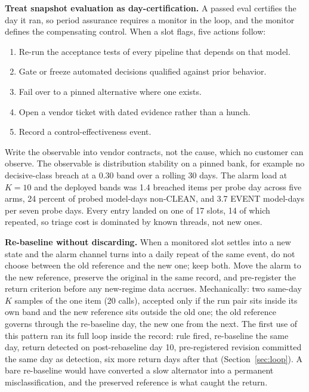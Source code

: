 \documentclass[conference]{IEEEtran}
\begin{document}
\textbf{Treat snapshot evaluation as day-certification.} A passed eval
certifies the day it ran, so period assurance requires a monitor in
the loop, and the monitor defines the compensating control. When a
slot flags, five actions follow:
\begin{enumerate}\itemsep0pt
\item Re-run the acceptance tests of every pipeline that depends on
  that model.
\item Gate or freeze automated decisions qualified against prior
  behavior.
\item Fail over to a pinned alternative where one exists.
\item Open a vendor ticket with dated evidence rather than a hunch.
\item Record a control-effectiveness event.
\end{enumerate}

Write the observable into vendor contracts, not the cause, which no
customer can observe. The observable is distribution stability on a
pinned bank, for example no decisive-class breach at a 0.30 band over
a rolling 30 days. The alarm load at $K{=}10$ and the deployed bands
was 1.4 breached items per probe day across five arms, 24 percent of
probed model-days non-CLEAN, and 3.7 EVENT model-days per seven probe
days. Every entry landed on one of 17 slots, 14 of which repeated, so
triage cost is dominated by known threads, not new ones.

\textbf{Re-baseline without discarding.} When a monitored slot settles
into a new state and the alarm channel turns into a daily repeat of
the same event, do not choose between the old reference and the new
one; keep both. Move the alarm to the new reference, preserve the
original in the same record, and pre-register the return criterion
before any new-regime data accrues. Mechanically: two same-day $K$
samples of the one item (20 calls), accepted only if the run pair sits
inside its own band and the new reference sits outside the old one;
the old reference governs through the re-baseline day, the new one
from the next. The first use of this pattern ran its full loop inside
the record: rule fired, re-baseline the same day, return detected on
post-rebaseline day 10, pre-registered revision committed the same day
as detection, six more return days after that
(Section~\ref{sec:loop}). A bare re-baseline would have converted a
slow alternator into a permanent misclassification, and the preserved
reference is what caught the return.
\end{document}
